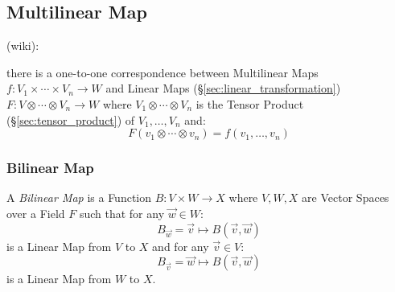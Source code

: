 \subsection{Multilinear Map}\label{sec:multilinear_map}

(wiki):

there is a one-to-one correspondence between Multilinear Maps
$f : V_1 \times \cdots \times V_n \rightarrow W$
and Linear Maps (\S\ref{sec:linear_transformation})
$F : V \otimes \cdots \otimes V_n \rightarrow W$
where $V_1 \otimes \cdots \otimes V_n$ is the Tensor Product
(\S\ref{sec:tensor_product}) of $V_1, \ldots, V_n$ and:
\[
  F(v_1 \otimes \cdots \otimes v_n) = f(v_1, \ldots, v_n)
\]



\subsubsection{Bilinear Map}\label{sec:bilinear_map}

A \emph{Bilinear Map} is a Function $B : V \times W \rightarrow X$ where
$V, W, X$ are Vector Spaces over a Field $F$ such that for any $\vec{w} \in W$:
\[
  B_{\vec{w}} = \vec{v} \mapsto B(\vec{v}, \vec{w})
\]
is a Linear Map from $V$ to $X$ and for any $\vec{v} \in V$:
\[
  B_{\vec{v}} = \vec{w} \mapsto B(\vec{v}, \vec{w})
\]
is a Linear Map from $W$ to $X$.

